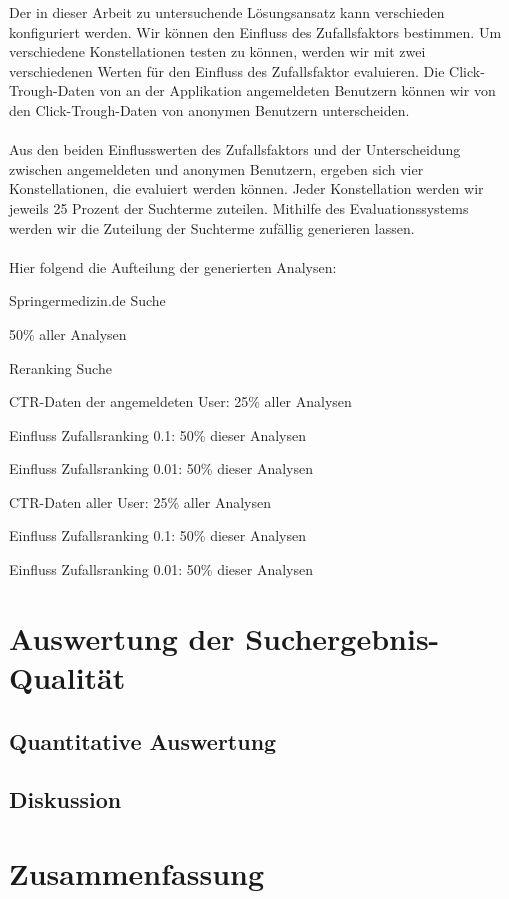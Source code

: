 Der in dieser Arbeit zu untersuchende Lösungsansatz kann verschieden konfiguriert werden. Wir können den Einfluss des Zufallsfaktors bestimmen. Um verschiedene Konstellationen testen zu können, werden wir mit zwei verschiedenen Werten für den Einfluss des Zufallsfaktor evaluieren. Die Click-Trough-Daten von an der Applikation angemeldeten Benutzern können wir von den Click-Trough-Daten von anonymen Benutzern unterscheiden.
\\
\\
Aus den beiden Einflusswerten des Zufallsfaktors und der Unterscheidung zwischen angemeldeten und anonymen Benutzern, ergeben sich vier Konstellationen, die evaluiert werden können. Jeder Konstellation werden wir jeweils 25 Prozent der Suchterme zuteilen. Mithilfe des Evaluationssystems werden wir die Zuteilung der Suchterme zufällig generieren lassen.
\\
\\
Hier folgend die Aufteilung der generierten Analysen:

\centering
\begin{myitemize}
\setlength\itemsep{0em}
\item Springermedizin.de Suche 
\begin{myitemize}
\item 50\% aller Analysen
\end{myitemize}
\item Reranking Suche 
\begin{myitemize}
\item CTR-Daten der angemeldeten User: 25\% aller Analysen
\begin{myitemize}
\item Einfluss Zufallsranking 0.1: 50\% dieser Analysen 
\item Einfluss Zufallsranking 0.01: 50\% dieser Analysen 
\end{myitemize}
\item CTR-Daten aller User: 25\% aller Analysen
\begin{myitemize}
\item Einfluss Zufallsranking 0.1: 50\% dieser Analysen 
\item Einfluss Zufallsranking 0.01: 50\% dieser Analysen 
\end{myitemize}
\end{myitemize}
\end{myitemize}

\section{Auswertung der Suchergebnis-Qualität}
\label{sec:Evaluation:Auswertung}

\subsection{Quantitative Auswertung}
\label{sec:Evaluation:Auswertung:QuantitativeAuswertung}

\subsection{Diskussion}
\label{sec:Evaluation:Auswertung:Diskussion}

\section{Zusammenfassung}
\label{sec:Evaluation:Zusammenfassung}